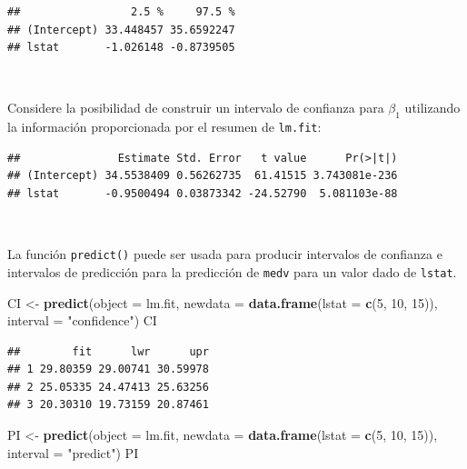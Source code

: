 \documentclass[]{book}
\newenvironment{Shaded}{\begin{snugshade}}{\end{snugshade}}
\newcommand{\KeywordTok}[1]{\textcolor[rgb]{0.13,0.29,0.53}{\textbf{#1}}}
\newcommand{\DataTypeTok}[1]{\textcolor[rgb]{0.13,0.29,0.53}{#1}}
\newcommand{\DecValTok}[1]{\textcolor[rgb]{0.00,0.00,0.81}{#1}}
\newcommand{\StringTok}[1]{\textcolor[rgb]{0.31,0.60,0.02}{#1}}
\newcommand{\OperatorTok}[1]{\textcolor[rgb]{0.81,0.36,0.00}{\textbf{#1}}}
\newcommand{\NormalTok}[1]{#1}
\begin{document}
\begin{verbatim}
##                 2.5 %     97.5 %
## (Intercept) 33.448457 35.6592247
## lstat       -1.026148 -0.8739505
\end{verbatim}

~

Considere la posibilidad de construir un intervalo de confianza para
\(\beta_1\) utilizando la información proporcionada por el resumen de
\texttt{lm.fit}:

\begin{Shaded}
\end{Shaded}

\begin{verbatim}
##               Estimate Std. Error   t value      Pr(>|t|)
## (Intercept) 34.5538409 0.56262735  61.41515 3.743081e-236
## lstat       -0.9500494 0.03873342 -24.52790  5.081103e-88
\end{verbatim}

~

La función \texttt{predict()} puede ser usada para producir intervalos
de confianza e intervalos de predicción para la predicción de
\texttt{medv} para un valor dado de \texttt{lstat}.

\begin{Shaded}
\begin{Highlighting}[]
\NormalTok{CI <-}\StringTok{ }\KeywordTok{predict}\NormalTok{(}\DataTypeTok{object =}\NormalTok{ lm.fit, }\DataTypeTok{newdata =} \KeywordTok{data.frame}\NormalTok{(}\DataTypeTok{lstat =} \KeywordTok{c}\NormalTok{(}\DecValTok{5}\NormalTok{, }\DecValTok{10}\NormalTok{, }\DecValTok{15}\NormalTok{)), }
              \DataTypeTok{interval =} \StringTok{"confidence"}\NormalTok{)}
\NormalTok{CI}
\end{Highlighting}
\end{Shaded}

\begin{verbatim}
##        fit      lwr      upr
## 1 29.80359 29.00741 30.59978
## 2 25.05335 24.47413 25.63256
## 3 20.30310 19.73159 20.87461
\end{verbatim}

\begin{Shaded}
\begin{Highlighting}[]
\NormalTok{PI <-}\StringTok{ }\KeywordTok{predict}\NormalTok{(}\DataTypeTok{object =}\NormalTok{ lm.fit, }\DataTypeTok{newdata =} \KeywordTok{data.frame}\NormalTok{(}\DataTypeTok{lstat =} \KeywordTok{c}\NormalTok{(}\DecValTok{5}\NormalTok{, }\DecValTok{10}\NormalTok{, }\DecValTok{15}\NormalTok{)), }
              \DataTypeTok{interval =} \StringTok{"predict"}\NormalTok{)}
\NormalTok{PI}
\end{Highlighting}
\end{Shaded}
\end{document}
